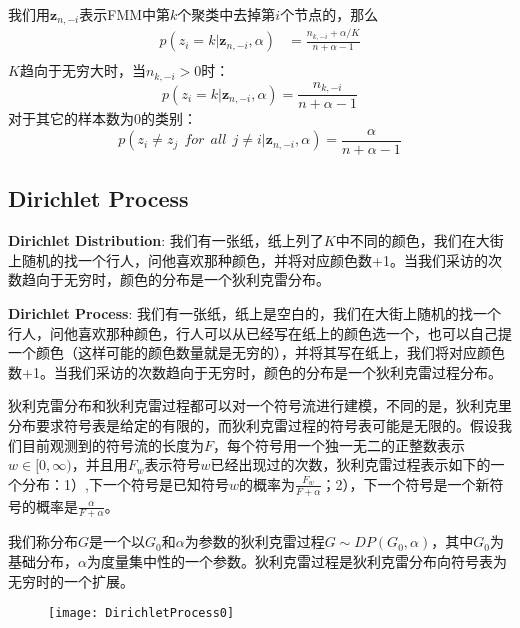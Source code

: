 我们用$\mathbf{z}_{n,-i}$表示FMM中第$k$个聚类中去掉第$i$个节点的，那么
\begin{displaymath}
\begin{split}
p(z_i=k|\mathbf{z}_{n,-i}, \alpha) &= \frac{n_{k,-i} + \alpha/K}{n+\alpha-1}\\
\end{split}
\end{displaymath}
$K$趋向于无穷大时，当$n_{k,-i} > 0$时：
\begin{displaymath}
p(z_i=k|\mathbf{z}_{n,-i}, \alpha) = \frac{n_{k,-i}}{n+\alpha-1}
\end{displaymath}
对于其它的样本数为0的类别：
\begin{displaymath}
p(z_i \neq z_j ~~for~~all~~j \neq i|\mathbf{z}_{n,-i}, \alpha) = \frac{\alpha}{n+\alpha-1}
\end{displaymath}

\subsection{Dirichlet Process}

\textbf{Dirichlet Distribution}: 我们有一张纸，纸上列了$K$中不同的颜色，我们在大街上随机的找一个行人，问他喜欢那种颜色，并将对应颜色数+1。当我们采访的次数趋向于无穷时，颜色的分布是一个狄利克雷分布。

\textbf{Dirichlet Process}: 我们有一张纸，纸上是空白的，我们在大街上随机的找一个行人，问他喜欢那种颜色，行人可以从已经写在纸上的颜色选一个，也可以自己提一个颜色（这样可能的颜色数量就是无穷的），并将其写在纸上，我们将对应颜色数+1。当我们采访的次数趋向于无穷时，颜色的分布是一个狄利克雷过程分布。

狄利克雷分布和狄利克雷过程都可以对一个符号流进行建模，不同的是，狄利克里分布要求符号表是给定的有限的，而狄利克雷过程的符号表可能是无限的。假设我们目前观测到的符号流的长度为$F$，每个符号用一个独一无二的正整数表示$w \in [0, \infty)$，并且用$F_w$表示符号$w$已经出现过的次数，狄利克雷过程表示如下的一个分布：1）,下一个符号是已知符号$w$的概率为$\frac{F_w}{F+\alpha}$；2），下一个符号是一个新符号的概率是$\frac{\alpha}{F+\alpha}$。

我们称分布$G$是一个以$G_0$和$\alpha$为参数的狄利克雷过程$G \sim DP(G_0, \alpha)$，其中$G_0$为基础分布，$\alpha$为度量集中性的一个参数。狄利克雷过程是狄利克雷分布向符号表为无穷时的一个扩展。
\begin{figure}[htbp]
\centering
\texttt{[image: DirichletProcess0]}
\end{figure}

